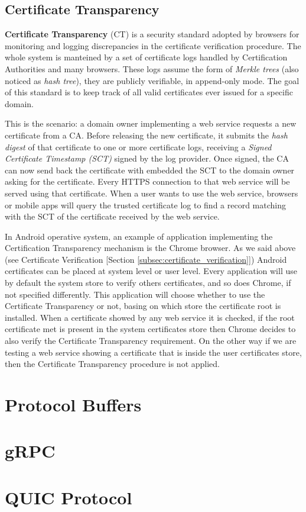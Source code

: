 		\subsection{Certificate Transparency}
		\label{subsec:certification_transparency}
			\par \textbf{Certificate Transparency} (CT) is a security standard adopted by browsers for monitoring and logging discrepancies in the certificate verification procedure. The whole system is manteined by a set of certificate logs handled by Certification Authorities and many browsers. These logs assume the form of \textit{Merkle trees} (also noticed as \textit{hash tree}), they are publicly verifiable, in append-only mode. The goal of this standard is to keep track of all valid certificates ever issued for a specific domain. \newline
			\par	This is the scenario: a domain owner implementing a web service requests a new certificate from a CA. Before releasing the new certificate, it submits the \textit{hash digest} of that certificate to one or more certificate logs, receiving a \textit{Signed Certificate Timestamp (SCT)} signed by the log provider. Once signed, the CA can now send back the certificate with embedded the SCT to the domain owner asking for the certificate. Every HTTPS connection to that web service will be served using that certificate. When a user wants to use the web service, browsers or mobile apps will query the trusted certificate log to find a record matching with the SCT of the certificate received by the web service. \newline
			\par In Android operative system, an example of application implementing the Certification Transparency mechanism is the Chrome browser. As we said above (see Certificate Verification [Section \ref{subsec:certificate_verification}]) Android certificates can be placed at system level or user level. Every application will use by default the system store to verify others certificates, and so does Chrome, if not specified differently. This application will choose whether to use the Certificate Transparency or not, basing on which store the certificate root is installed. When a certificate showed by any web service it is checked, if the root certificate met is present in the system certificates store then Chrome decides to also verify the Certificate Transparency requirement. On the other way if we are testing a web service showing a certificate that is inside the user certificates store, then the Certificate Transparency procedure is not applied.\newline 
			
	\section{Protocol Buffers}
		\par 

	\section{gRPC}
		\par 

	\section{QUIC Protocol}
		\par 
	